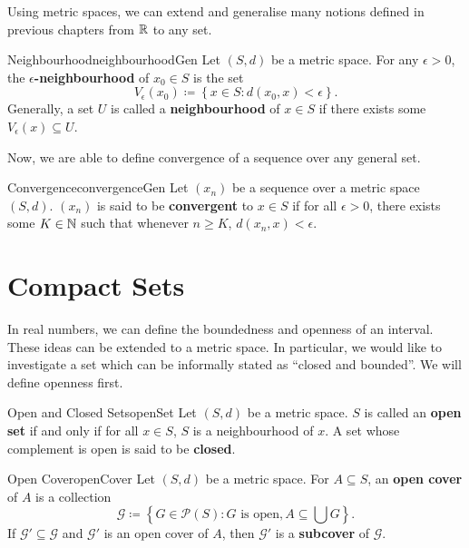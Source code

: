 \documentclass[math]{amznotes}
\theoremstyle{remark}
\begin{document}
Using metric spaces, we can extend and generalise many notions defined in previous chapters from $\mathbb{R}$ to any set.
\begin{dfnbox}{Neighbourhood}{neighbourhoodGen}
    Let $(S, d)$ be a metric space. For any $\epsilon > 0$, the {\color{red} \textbf{$\epsilon$-neighbourhood}} of $x_0 \in S$ is the set
    \begin{equation*}
        V_\epsilon(x_0) \coloneqq \left\{x \in S \colon d(x_0, x) < \epsilon\right\}.
    \end{equation*}
    Generally, a set $U$ is called a {\color{red} \textbf{neighbourhood}} of $x \in S$ if there exists some $V_\epsilon(x) \subseteq U$.
\end{dfnbox}
Now, we are able to define convergence of a sequence over any general set.
\begin{dfnbox}{Convergence}{convergenceGen}
    Let $(x_n)$ be a sequence over a metric space $(S, d)$. $(x_n)$ is said to be {\color{red} \textbf{convergent}} to $x \in S$ if for all $\epsilon > 0$, there exists some $K \in \mathbb{N}$ such that whenever $n \geq K$, $d(x_n, x) < \epsilon$.
\end{dfnbox}

\section{Compact Sets}
In real numbers, we can define the boundedness and openness of an interval. These ideas can be extended to a metric space. In particular, we would like to investigate a set which can be informally stated as ``closed and bounded''. We will define openness first.
\begin{dfnbox}{Open and Closed Sets}{openSet}
    Let $(S, d)$ be a metric space. $S$ is called an {\color{red} \textbf{open set}} if and only if for all $x \in S$, $S$ is a neighbourhood of $x$. A set whose complement is open is said to be {\color{red} \textbf{closed}}.
\end{dfnbox} 
\begin{dfnbox}{Open Cover}{openCover}
    Let $(S, d)$ be a metric space. For $A \subseteq S$, an {\color{red} \textbf{open cover}} of $A$ is a collection
    \begin{equation*}
        \mathcal{G} \coloneqq \left\{G \in \mathcal{P}(S) \colon G \textrm{ is open}, A \subseteq \bigcup G\right\}.
    \end{equation*}
    If $\mathcal{G}' \subseteq \mathcal{G}$ and $\mathcal{G}'$ is an open cover of $A$, then $\mathcal{G}'$ is a {\color{red} \textbf{subcover}} of $\mathcal{G}$.
\end{dfnbox}
\end{document}
